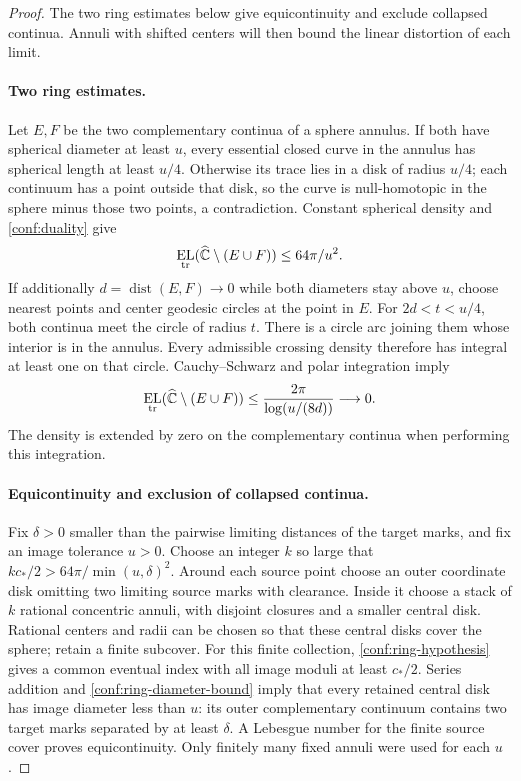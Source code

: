 \documentclass[11pt]{article}
\numberwithin{equation}{section}
\theoremstyle{definition}
\theoremstyle{remark}
\newcommand{\Chat}{\widehat{\mathbb C}}
\newcommand{\1}{\mathbf 1}
\DeclareMathOperator{\EL}{EL}
\DeclareMathOperator{\dist}{dist}
\begin{document}
\begin{proof}
The two ring estimates below give equicontinuity and exclude collapsed
continua.  Annuli with shifted centers will then bound the linear
distortion of each limit.

\paragraph{Two ring estimates.}
Let \(E,F\) be the two
complementary continua of a sphere annulus.  If both have spherical
diameter at least \(u\), every essential closed curve in the annulus
has spherical length at least \(u/4\).  Otherwise its trace lies
in a disk of radius \(u/4\); each continuum has a point outside
that disk, so the curve is null-homotopic in the sphere minus those
two points, a contradiction.  Constant spherical density and
\eqref{conf:duality} give
\begin{equation}
 \EL_{\rm tr}(\Chat\setminus(E\cup F))
       \le 64\pi/u^2.
 \label{conf:ring-diameter-bound}
\end{equation}
If additionally \(d=\dist(E,F)\to0\) while both diameters stay
above \(u\), choose nearest points and center geodesic circles at
the point in \(E\).  For \(2d<t<u/4\), both continua meet the
circle of radius \(t\).  There is a circle arc joining them whose
interior is in the annulus.  Every admissible crossing density
therefore has integral at least one on that circle.  Cauchy--Schwarz
and polar integration imply
\begin{equation}
 \EL_{\rm tr}(\Chat\setminus(E\cup F))
       \le \frac{2\pi}{\log(u/(8d))}\longrightarrow0.
 \label{conf:ring-touching-bound}
\end{equation}
The density is extended by zero on the complementary continua when
performing this integration.

\paragraph{Equicontinuity and exclusion of collapsed continua.}
Fix \(\delta>0\) smaller than the pairwise limiting distances of
the target marks, and fix an image tolerance \(u>0\).  Choose
an integer \(k\) so large that
\(kc_*/2>64\pi/\min(u,\delta)^2\).  Around each source point
choose an outer coordinate disk omitting two limiting source marks
with clearance.  Inside it choose a stack of \(k\) rational
concentric annuli, with disjoint closures and a smaller central
disk.  Rational centers and radii can be chosen so that these
central disks cover the sphere; retain a finite subcover.  For this
finite collection, \eqref{conf:ring-hypothesis} gives a common
eventual index with all image moduli at least \(c_*/2\).  Series
addition and \eqref{conf:ring-diameter-bound} imply that every
retained central disk has image diameter less than \(u\): its
outer complementary continuum contains two target marks separated
by at least \(\delta\).  A Lebesgue number for the finite source
cover proves equicontinuity.  Only finitely many fixed annuli were
used for each \(u\).


\end{proof}
\end{document}

